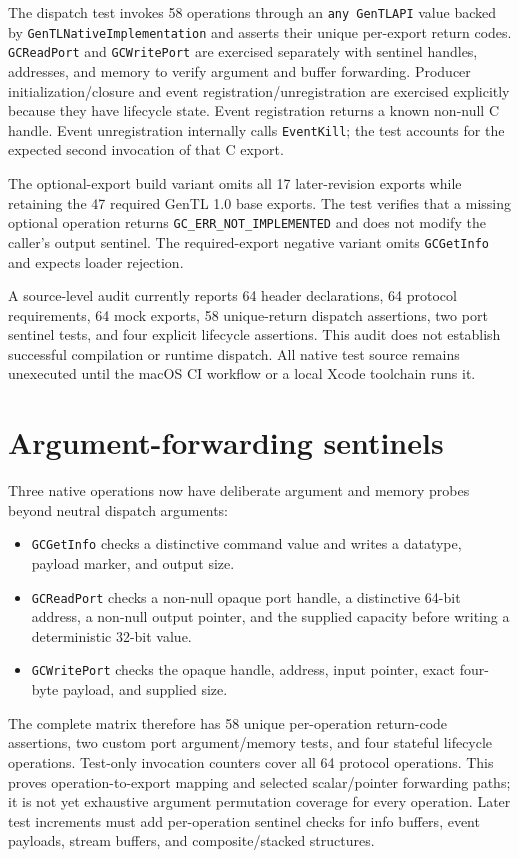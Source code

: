 \documentclass[11pt,a4paper]{report}
\begin{document}
The dispatch test invokes 58 operations through an \texttt{any GenTLAPI} value backed by \texttt{GenTLNativeImplementation} and asserts their unique per-export return codes. \texttt{GCReadPort} and \texttt{GCWritePort} are exercised separately with sentinel handles, addresses, and memory to verify argument and buffer forwarding. Producer initialization/closure and event registration/unregistration are exercised explicitly because they have lifecycle state. Event registration returns a known non-null C handle. Event unregistration internally calls \texttt{EventKill}; the test accounts for the expected second invocation of that C export.

The optional-export build variant omits all 17 later-revision exports while retaining the 47 required GenTL 1.0 base exports. The test verifies that a missing optional operation returns \texttt{GC\_ERR\_NOT\_IMPLEMENTED} and does not modify the caller's output sentinel. The required-export negative variant omits \texttt{GCGetInfo} and expects loader rejection.

A source-level audit currently reports 64 header declarations, 64 protocol requirements, 64 mock exports, 58 unique-return dispatch assertions, two port sentinel tests, and four explicit lifecycle assertions. This audit does not establish successful compilation or runtime dispatch. All native test source remains unexecuted until the macOS CI workflow or a local Xcode toolchain runs it.



\section{Argument-forwarding sentinels}
Three native operations now have deliberate argument and memory probes beyond neutral dispatch arguments:
\begin{itemize}
  \item \texttt{GCGetInfo} checks a distinctive command value and writes a datatype, payload marker, and output size.
  \item \texttt{GCReadPort} checks a non-null opaque port handle, a distinctive 64-bit address, a non-null output pointer, and the supplied capacity before writing a deterministic 32-bit value.
  \item \texttt{GCWritePort} checks the opaque handle, address, input pointer, exact four-byte payload, and supplied size.
\end{itemize}
The complete matrix therefore has 58 unique per-operation return-code assertions, two custom port argument/memory tests, and four stateful lifecycle operations. Test-only invocation counters cover all 64 protocol operations. This proves operation-to-export mapping and selected scalar/pointer forwarding paths; it is not yet exhaustive argument permutation coverage for every operation. Later test increments must add per-operation sentinel checks for info buffers, event payloads, stream buffers, and composite/stacked structures.
\end{document}
